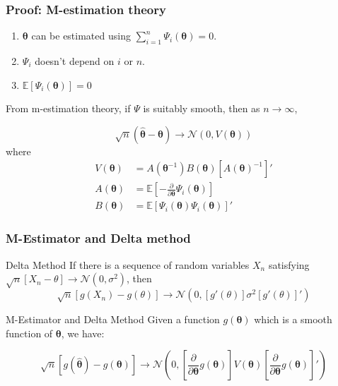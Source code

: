 \documentclass{beamer}
\begin{document}
\begin{frame}
	\frametitle{Proof: M-estimation theory}
	\begin{enumerate}
		\item $ \bm{\theta} $ can be estimated using $ \sum_{i=1}^n \Psi_i(\bm{\theta}) = 0 $.
		\item $ \Psi_i $ doesn't depend on $ i $ or $ n $.
		\item $ \mathbb{E}[\Psi_i(\bm{\theta})] = 0 $
	\end{enumerate}

	From m-estimation theory, if $ \Psi $ is suitably smooth, then as $ n \to \infty $,

	$$ \sqrt{n}(\hat{\bm{\theta}} - \bm{\theta}) \to \mathcal{N}(0, V(\bm{\theta})) $$
	where 
	\begin{equation*}
		\begin{split}
			V(\bm{\theta}) &= A(\bm{\theta}^{-1}) B(\bm{\theta})[A(\bm{\theta})^{-1}]' \\
			A(\bm{\theta}) &= \mathbb{E} \left[ - \frac{\partial}{\partial \bm{\theta}} \Psi_i(\bm{\theta}) \right] \\ 
			B(\bm{\theta}) &= \mathbb{E}[\Psi_i(\bm{\theta}) \Psi_i(\bm{\theta})]'
		\end{split}
	\end{equation*}

\end{frame}

\begin{frame}
	\frametitle{M-Estimator and Delta method}
	\begin{block}{Delta Method}
		If there is a sequence of random variables $X_n$ satisfying $ \sqrt{n}[X_n - \theta] \rightarrow \mathcal{N}(0, \sigma^2) $, then
		$$ \sqrt{n}[g(X_n) - g(\theta)] \rightarrow \mathcal{N}(0, [g'(\theta)] \sigma^2 [g'(\theta)]')$$
	\end{block}
	\begin{block}{M-Estimator and Delta Method}
		Given a function $ g(\bm{\theta}) $ which is a smooth function of $ \bm{\theta} $, we have:

		$$ \sqrt{n} \left[ g(\hat{\bm{\theta}}) - g(\bm{\theta}) \right] \to \mathcal{N} \left( 0, \left[ \frac{\partial}{\partial \bm{\theta}} g(\bm{\theta}) \right] V(\bm{\theta}) \left[ \frac{\partial}{\partial \bm{\theta}} g(\bm{\theta}) \right]' \right) $$
	\end{block}
\end{frame}
\end{document}
